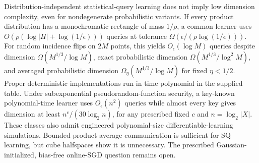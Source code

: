 Distribution-independent statistical-query learning does not imply low dimension complexity, even for nondegenerate probabilistic variants. If every product distribution has a monochromatic rectangle of mass $1/\rho$, a common learner uses $O(\rho(\log|H|+\log(1/\epsilon)))$ queries at tolerance $\Omega(\epsilon/(\rho\log(1/\epsilon)))$. For random incidence flips on $2M$ points, this yields $O_\epsilon(\log M)$ queries despite dimension $\Omega(M^{1/3}/\log M)$, exact probabilistic dimension $\Omega(M^{1/3}/\log^2 M)$, and averaged probabilistic dimension $\Omega_\eta(M^{1/3}/\log M)$ for fixed $\eta<1/2$. Proper deterministic implementations run in time polynomial in the supplied table. Under subexponential pseudorandom-function security, a key-known polynomial-time learner uses $O_\epsilon(n^2)$ queries while almost every key gives dimension at least $n^c/(30\log_2 n)$, for any prescribed fixed $c$ and $n=\log_2|X|$. These classes also admit engineered polynomial-size differentiable-learning simulations. Bounded product-average communication is sufficient for SQ learning, but cube halfspaces show it is unnecessary. The prescribed Gaussian-initialized, bias-free online-SGD question remains open.
